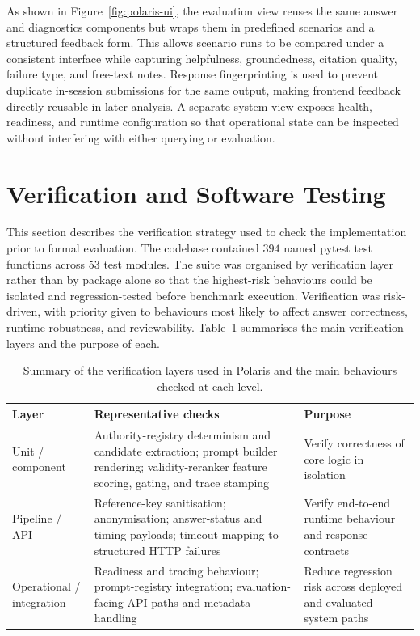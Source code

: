 As shown in Figure~\ref{fig:polaris-ui}, the evaluation view reuses the same answer and diagnostics components but wraps them in predefined scenarios and a structured feedback form. This allows scenario runs to be compared under a consistent interface while capturing helpfulness, groundedness, citation quality, failure type, and free-text notes. Response fingerprinting is used to prevent duplicate in-session submissions for the same output, making frontend feedback directly reusable in later analysis. A separate system view exposes health, readiness, and runtime configuration so that operational state can be inspected without interfering with either querying or evaluation. 

\section{Verification and Software Testing}
\label{sec:verification-testing}

This section describes the verification strategy used to check the implementation prior to formal evaluation. The codebase contained $394$ named pytest test functions across $53$ test modules. The suite was organised by verification layer rather than by package alone so that the highest-risk behaviours could be isolated and regression-tested before benchmark execution. Verification was risk-driven, with priority given to behaviours most likely to affect answer correctness, runtime robustness, and reviewability. Table~\ref{tab:polaris-verification-summary} summarises the main verification layers and the purpose of each. 

\begin{table}[ht]
    \centering
    \caption[Summary of the Polaris verification strategy.]{Summary of the verification layers used in Polaris and the main behaviours checked at each level.}
    \label{tab:polaris-verification-summary}
    \begin{tabular}{p{} p{} p{}}
        \toprule
        Layer & Representative checks & Purpose \\
        \midrule
        Unit / component & Authority-registry determinism and candidate extraction; prompt builder rendering; validity-reranker feature scoring, gating, and trace stamping & Verify correctness of core logic in isolation \\
        Pipeline / API & Reference-key sanitisation; anonymisation; answer-status and timing payloads; timeout mapping to structured HTTP failures & Verify end-to-end runtime behaviour and response contracts \\
        Operational / integration & Readiness and tracing behaviour; prompt-registry integration; evaluation-facing API paths and metadata handling & Reduce regression risk across deployed and evaluated system paths \\
        \bottomrule
    \end{tabular}
\end{table}

